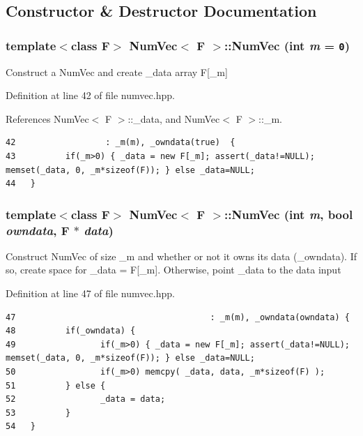 \subsection{Constructor \& Destructor Documentation}
\subsubsection{\setlength{\rightskip}{0pt plus 5cm}template$<$class F$>$ {\bf Num\-Vec}$<$ F $>$::{\bf Num\-Vec} (int {\em m} = {\tt 0})\hspace{0.3cm}{\tt  [inline]}}\label{classNumVec_5f668d72bf28bf0fed217368b93aee98_5f668d72bf28bf0fed217368b93aee98}


Construct a Num\-Vec and create \_\-data array F[\_\-m] 

Definition at line 42 of file numvec.hpp.

References Num\-Vec$<$ F $>$::\_\-data, and Num\-Vec$<$ F $>$::\_\-m.

\footnotesize\begin{verbatim}42                  : _m(m), _owndata(true)  {
43          if(_m>0) { _data = new F[_m]; assert(_data!=NULL); memset(_data, 0, _m*sizeof(F)); } else _data=NULL;
44   }
\end{verbatim}\normalsize 


\subsubsection{\setlength{\rightskip}{0pt plus 5cm}template$<$class F$>$ {\bf Num\-Vec}$<$ F $>$::{\bf Num\-Vec} (int {\em m}, bool {\em owndata}, F $\ast$ {\em data})\hspace{0.3cm}{\tt  [inline]}}\label{classNumVec_dbcd1a409800a6f56df0f761d7d29dca_dbcd1a409800a6f56df0f761d7d29dca}


Construct Num\-Vec of size \_\-m and whether or not it owns its data (\_\-owndata). If so, create space for \_\-data = F[\_\-m]. Otherwise, point \_\-data to the data input 

Definition at line 47 of file numvec.hpp.

\footnotesize\begin{verbatim}47                                       : _m(m), _owndata(owndata) {
48          if(_owndata) {
49                 if(_m>0) { _data = new F[_m]; assert(_data!=NULL); memset(_data, 0, _m*sizeof(F)); } else _data=NULL;
50                 if(_m>0) memcpy( _data, data, _m*sizeof(F) );
51          } else {
52                 _data = data;
53          }
54   }
\end{verbatim}\normalsize 


